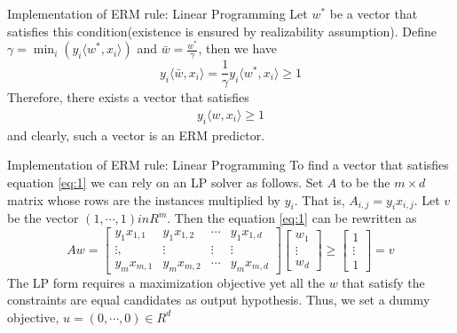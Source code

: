 \documentclass{beamer}
\begin{document}
\begin{frame}{Implementation of ERM rule: Linear Programming}
	Let $w^*$ be a vector that satisfies this condition(existence is ensured by realizability assumption). Define $\gamma = \min_i (y_i \langle w^*,x_i \rangle)$ and $\bar{w} = \frac{w^*}{\gamma}$, then we have
	\[y_i \langle \bar{w}, x_i \rangle = \frac{1}{\gamma} y_i \langle w^*,x_i \rangle \geq 1\]
	Therefore, there exists a vector that satisfies 
	\begin{align}
		y_i \langle w,x_i \rangle \geq 1 \label{eq:1} 
	\end{align}
	and clearly, such a vector is an ERM predictor.
\end{frame}
\begin{frame}{Implementation of ERM rule: Linear Programming}
	To find a vector that satisfies equation \ref{eq:1} we can rely on an LP solver as follows. Set $A$ to be the $m \times d$ matrix whose rows are the instances multiplied by $y_i$. That is, $A_{i,j} = y_ix_{i,j}$. Let $v$ be the vector $(1, \cdots,1) in R^m$. Then the equation \ref{eq:1} can be rewritten as 
	\[ Aw = 
	\begin{bmatrix}
		y_1 x_{1,1} & y_1 x_{1,2} & \cdots & y_1 x_{1,d} \\
		\vdots , & \vdots & \vdots & \vdots \\
		y_m x_{m,1} & y_m x_{m,2} & \cdots & y_m x_{m,d}
	\end{bmatrix}
	\begin{bmatrix}
		w_1 \\
		\vdots \\
		w_d	
	\end{bmatrix}
	\geq 
	\begin{bmatrix}
		1 \\
		\vdots \\
		1
	\end{bmatrix}
	=v
\]
The LP form requires a maximization objective yet all the $w$ that satisfy the constraints are equal candidates as output hypothesis. Thus, we set a dummy objective, $u = (0,\cdots,0) \in R^d$
\end{frame}
\end{document}
